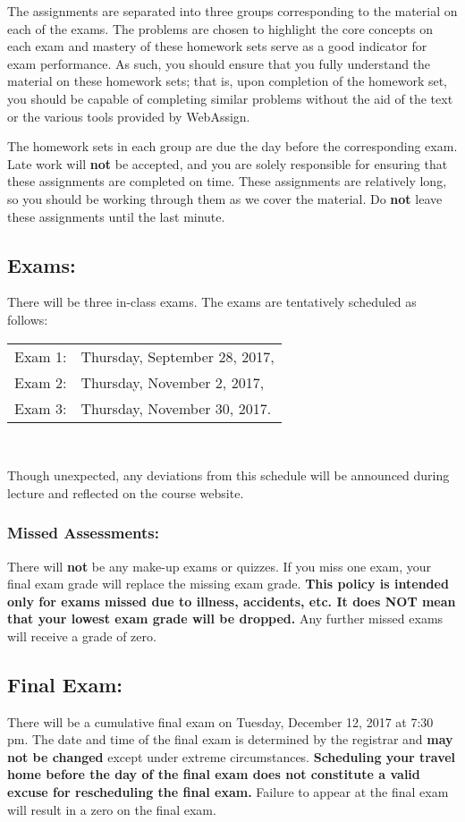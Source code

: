 \documentclass[10pt]{amsart}
\begin{document}
The assignments are separated into three groups corresponding to the material on each of the exams.
The problems are chosen to highlight the core concepts on each exam and mastery of these homework sets serve as a good indicator for exam performance.
As such, you should ensure that you fully understand the material on these homework sets; that is, upon completion of the homework set, you should be capable of completing similar problems without the aid of the text or the various tools provided by WebAssign.

The homework sets in each group are due the day before the corresponding exam.
Late work will {\bf not} be accepted, and you are solely responsible for ensuring that these assignments are completed on time.
These assignments are relatively long, so you should be working through them as we cover the material.
Do {\bf not} leave these assignments until the last minute.

\subsection*{Exams:}
There will be three in-class exams.
The exams are tentatively scheduled as follows:
\begin{center}
  \begin{tabular}{ll}
    Exam 1: & Thursday, September 28, 2017,\\
    Exam 2: & Thursday, November 2, 2017,\\
    Exam 3: & Thursday, November 30, 2017.\\
  \end{tabular}\\
\end{center}
Though unexpected, any deviations from this schedule will be announced during lecture and reflected on the course website.
\subsubsection*{Missed Assessments:}
There will {\bf not} be any make-up exams or quizzes.
If you miss one exam, your final exam grade will replace the missing exam grade.
\textbf{This policy is intended only for exams missed due to illness, accidents, etc.  
  It does NOT mean that your lowest exam grade will be dropped.}
Any further missed exams will receive a grade of zero.
\subsection*{Final Exam:} There will be a cumulative final exam on Tuesday, December 12, 2017 at 7:30 pm.
The date and time of the final exam is determined by the registrar and \textbf{may not be changed} except under extreme circumstances.
\textbf{Scheduling your travel home before the day of the final exam does not constitute a valid excuse for rescheduling the final exam.}
Failure to appear at the final exam will result in a zero on the final exam.
\end{document}
